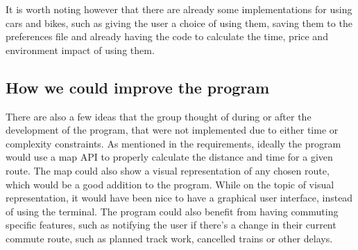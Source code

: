 It is worth noting however that there are already some implementations for using cars and bikes, such as giving the
user a choice of using them, saving them to the preferences file and already having the code to calculate the time,
price and environment impact of using them.

\subsection{How we could improve the program}\label{sec:improve-program}

There are also a few ideas that the group thought of during or after the development of the program, that were not
implemented due to either time or complexity constraints.
As mentioned in the requirements, ideally the program would use a map API to properly calculate the distance and time
for a given route.
The map could also show a visual representation of any chosen route, which would be a good addition to the program.
While on the topic of visual representation, it would have been nice to have a graphical user interface, instead of
using the terminal.
The program could also benefit from having commuting specific features, such as notifying the user if there's a change
in their current commute route, such as planned track work, cancelled trains or other delays.
